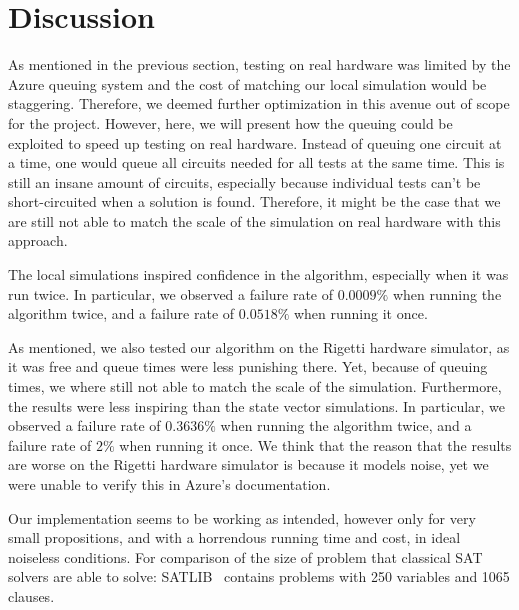 \section{Discussion}\label{sec:discussion}

As mentioned in the previous section, testing on real hardware was limited by the Azure queuing system and the cost of matching our local simulation would be staggering.
Therefore, we deemed further optimization in this avenue out of scope for the project.
However, here, we will present how the queuing could be exploited to speed up testing on real hardware.
Instead of queuing one circuit at a time, one would queue all circuits needed for all tests at the same time.
This is still an insane amount of circuits, especially because individual tests can't be short-circuited when a solution is found.
Therefore, it might be the case that we are still not able to match the scale of the simulation on real hardware with this approach.

The local simulations inspired confidence in the algorithm, especially when it was run twice.
In particular, we observed a failure rate of $0.0009\%$ when running the algorithm twice, and a failure rate of $0.0518\%$ when running it once.

As mentioned, we also tested our algorithm on the Rigetti hardware simulator, as it was free and queue times were less punishing there.
Yet, because of queuing times, we where still not able to match the scale of the simulation.
Furthermore, the results were less inspiring than the state vector simulations.
In particular, we observed a failure rate of $0.3636\%$ when running the algorithm twice, and a failure rate of $2\%$ when running it once.
We think that the reason that the results are worse on the Rigetti hardware simulator is because it models noise, yet we were unable to verify this in Azure's documentation.

Our implementation seems to be working as intended, however only for very small propositions, and with a horrendous running time and cost, in ideal noiseless conditions.
For comparison of the size of problem that classical SAT solvers are able to solve: SATLIB~\cite{hoos2000satlib} contains problems with 250 variables and 1065 clauses.
